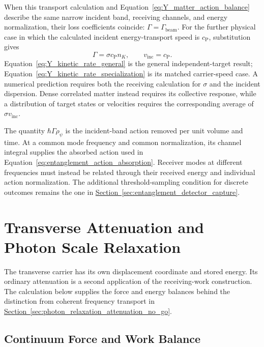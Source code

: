 When this transport calculation and Equation~\eqref{eq:Y_matter_action_balance} describe the same narrow incident band, receiving channels, and energy normalization, their loss coefficients coincide: $\Gamma=\Gamma_{\mathrm{beam}}$. For the further physical case in which the calculated incident energy-transport speed is $c_{\mathrm P}$, substitution gives
\begin{equation}
    \boxed{\Gamma=\sigma c_{\mathrm P}n_K},
    \qquad v_{\mathrm{inc}}=c_{\mathrm P}.
    \label{eq:Y_kinetic_rate_specialization}
\end{equation}
Equation~\eqref{eq:Y_kinetic_rate_general} is the general independent-target result; Equation~\eqref{eq:Y_kinetic_rate_specialization} is its matched carrier-speed case. A numerical prediction requires both the receiving calculation for $\sigma$ and the incident dispersion. Dense correlated matter instead requires its collective response, while a distribution of target states or velocities requires the corresponding average of $\sigma v_{\mathrm{inc}}$.

The quantity $\hbar\Gamma\rho_\psi$ is the incident-band action removed per unit volume and time. At a common mode frequency and common normalization, its channel integral supplies the absorbed action used in Equation~\eqref{eq:entanglement_action_absorption}. Receiver modes at different frequencies must instead be related through their received energy and individual action normalization. The additional threshold-sampling condition for discrete outcomes remains the one in \hyperref[sec:entanglement_detector_capture]{Section~\ref*{sec:entanglement_detector_capture}}.

\section{Transverse Attenuation and Photon Scale Relaxation}
\label{sec:Y_transverse_comparator}

The transverse carrier has its own displacement coordinate and stored energy. Its ordinary attenuation is a second application of the receiving-work construction. The calculation below supplies the force and energy balances behind the distinction from coherent frequency transport in \hyperref[sec:photon_relaxation_attenuation_no_go]{Section~\ref*{sec:photon_relaxation_attenuation_no_go}}.

\subsection{Continuum Force and Work Balance}
\label{sec:Y_transverse_balance}

